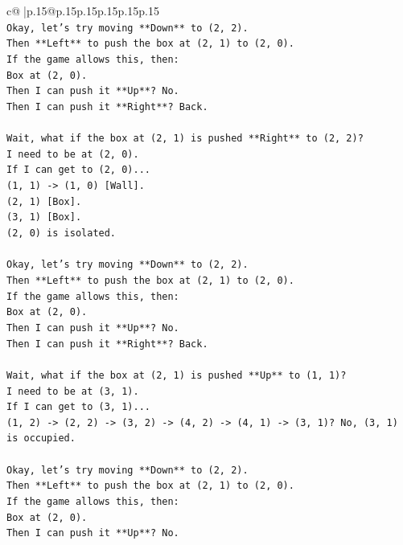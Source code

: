 \documentclass{article}
\begin{document}
{\begin{supertabular}{c@{$\;$}|p{.15\linewidth}@{}p{.15\linewidth}p{.15\linewidth}p{.15\linewidth}p{.15\linewidth}p{.15\linewidth}}
{{{\\ 
\texttt{Okay, let's try moving **Down** to (2, 2).} \\
\texttt{Then **Left** to push the box at (2, 1) to (2, 0).} \\
\texttt{If the game allows this, then:} \\
\texttt{Box at (2, 0).} \\
\texttt{Then I can push it **Up**? No.} \\
\texttt{Then I can push it **Right**? Back.} \\
\\ 
\texttt{Wait, what if the box at (2, 1) is pushed **Right** to (2, 2)?} \\
\texttt{I need to be at (2, 0).} \\
\texttt{If I can get to (2, 0)...} \\
\texttt{(1, 1) {-}> (1, 0) {[}Wall{]}.} \\
\texttt{(2, 1) {[}Box{]}.} \\
\texttt{(3, 1) {[}Box{]}.} \\
\texttt{(2, 0) is isolated.} \\
\\ 
\texttt{Okay, let's try moving **Down** to (2, 2).} \\
\texttt{Then **Left** to push the box at (2, 1) to (2, 0).} \\
\texttt{If the game allows this, then:} \\
\texttt{Box at (2, 0).} \\
\texttt{Then I can push it **Up**? No.} \\
\texttt{Then I can push it **Right**? Back.} \\
\\ 
\texttt{Wait, what if the box at (2, 1) is pushed **Up** to (1, 1)?} \\
\texttt{I need to be at (3, 1).} \\
\texttt{If I can get to (3, 1)...} \\
\texttt{(1, 2) {-}> (2, 2) {-}> (3, 2) {-}> (4, 2) {-}> (4, 1) {-}> (3, 1)? No, (3, 1) is occupied.} \\
\\ 
\texttt{Okay, let's try moving **Down** to (2, 2).} \\
\texttt{Then **Left** to push the box at (2, 1) to (2, 0).} \\
\texttt{If the game allows this, then:} \\
\texttt{Box at (2, 0).} \\
\texttt{Then I can push it **Up**? No.} \\
}}}
\end{supertabular}}
\end{document}
